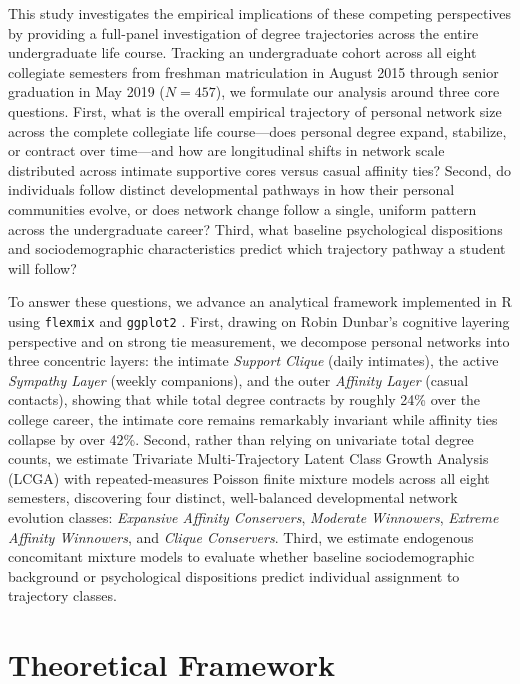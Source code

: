 \documentclass[12pt]{article}
\begin{document}
This study investigates the empirical implications of these competing perspectives by providing a full-panel investigation of degree trajectories across the entire undergraduate life course. Tracking an undergraduate cohort across all eight collegiate semesters from freshman matriculation in August 2015 through senior graduation in May 2019 ($N = 457$), we formulate our analysis around three core questions. First, what is the overall empirical trajectory of personal network size across the complete collegiate life course---does personal degree expand, stabilize, or contract over time---and how are longitudinal shifts in network scale distributed across intimate supportive cores versus casual affinity ties? Second, do individuals follow distinct developmental pathways in how their personal communities evolve, or does network change follow a single, uniform pattern across the undergraduate career? Third, what baseline psychological dispositions and sociodemographic characteristics predict which trajectory pathway a student will follow?

To answer these questions, we advance an analytical framework implemented in \textsf{R} \citep{rcoreteam2024} using \texttt{flexmix} \citep{grun2008flexmix} and \texttt{ggplot2} \citep{wickham2016ggplot2}. First, drawing on Robin Dunbar's cognitive layering perspective \citep{dunbar1992neocortex, dunbar2018anatomy} and \citet{marsden1984measuring} on strong tie measurement, we decompose personal networks into three concentric layers: the intimate \textit{Support Clique} (daily intimates), the active \textit{Sympathy Layer} (weekly companions), and the outer \textit{Affinity Layer} (casual contacts), showing that while total degree contracts by roughly 24\% over the college career, the intimate core remains remarkably invariant while affinity ties collapse by over 42\%. Second, rather than relying on univariate total degree counts, we estimate Trivariate Multi-Trajectory Latent Class Growth Analysis (LCGA) with repeated-measures Poisson finite mixture models across all eight semesters, discovering four distinct, well-balanced developmental network evolution classes: \textit{Expansive Affinity Conservers}, \textit{Moderate Winnowers}, \textit{Extreme Affinity Winnowers}, and \textit{Clique Conservers}. Third, we estimate endogenous concomitant mixture models to evaluate whether baseline sociodemographic background or psychological dispositions predict individual assignment to trajectory classes.

\section{Theoretical Framework}
\end{document}
